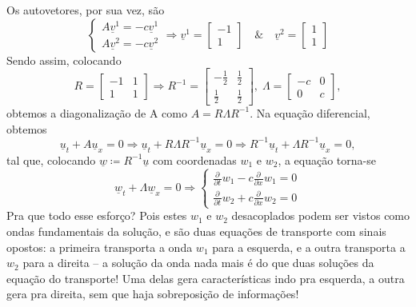 \documentclass[../differential_methods.tex]{subfiles}
\begin{document}
Os autovetores, por sua vez, são
\[
	\left\{\begin{array}{ll}
		A \underline{v}^{1} = -c \underline{v}^{1} \\
		A \underline{v}^{2} = -c \underline{v}^{2}
	\end{array}\right. \Rightarrow \underline{v}^{1}=\begin{bmatrix}
		-1 \\
		1
	\end{bmatrix} \quad\&\quad \underline{v}^{2} = \begin{bmatrix}
		1 \\
		1
	\end{bmatrix}
\]
Sendo assim, colocando
\[
	R = \begin{bmatrix}
		-1 & 1 \\
		1  & 1
	\end{bmatrix} \Rightarrow R^{-1}=\begin{bmatrix}
		-\frac{1}{2} & \frac{1}{2} \\
		\frac{1}{2}  & \frac{1}{2}
	\end{bmatrix},\; \Lambda = \begin{bmatrix}
		-c & 0 \\
		0  & c
	\end{bmatrix},
\]
obtemos a diagonalização de A como \(A = R\Lambda R^{-1}\). Na equação diferencial, obtemos
\[
	\underline{u}_t + A \underline{u}_x = 0 \Rightarrow \underline{u}_t + R\Lambda R^{-1}\underline{u}_x = 0 \Rightarrow R^{-1}\underline{u}_t + \Lambda R^{-1}\underline{u}_x = 0,
\]
tal que, colocando \(\underline{w} \coloneqq R^{-1}\underline{u}\) com coordenadas \(w_1\) e \(w_2\), a equação torna-se
\[
	\underline{w}_t + \Lambda \underline{w}_x = 0 \Rightarrow \left\{\begin{array}{ll}
		\frac{\partial^{}}{\partial t^{}}w_1 - c \frac{\partial^{}}{\partial x^{}}w_1 = 0 \\
		\frac{\partial^{}}{\partial t^{}}w_2 + c \frac{\partial^{}}{\partial x^{}}w_2 = 0
	\end{array}\right.
\]
Pra que todo esse esforço? Pois estes \(w_1\) e \(w_2\) desacoplados podem ser vistos como ondas fundamentais da solução, e são duas equações de transporte com sinais opostos: a primeira transporta a onda \(w_1\) para a esquerda, e a outra transporta a \(w_2\) para a direita -- a solução da onda nada mais é do que duas soluções da equação do transporte!
Uma delas gera características indo pra esquerda, a outra gera pra direita, sem que haja sobreposição de informações!
\end{document}
